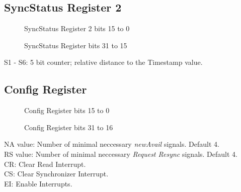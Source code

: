 \subsection{SyncStatus Register 2} 
\label{sec:SyncStatusReg2}
\begin{figure}[htb]
	\begin{center}
	\end{center}
	\caption[SyncStatus Register 2 bits 15 to 0]{SyncStatus Register 2 bits 15 to 0}
	\label{fig:SSR21}
\end{figure}
\begin{figure}[htb]
	\begin{center}
	\end{center}
	\caption[SyncStatus Register bits 31 to 16]{SyncStatus Register bits 31 to 15}
	\label{fig:SSR22}
\end{figure}
S1 - S6: 5 bit counter; relative distance to the Timestamp value. \\
\subsection{Config  Register} 
\label{sec:configReg}
\begin{figure}[htb]
	\begin{center}
	\end{center}
	\caption[Config Register bits 15 to 0]{Config Register bits 15 to 0}
	\label{fig:CR1}
\end{figure}
\begin{figure}[!htb]
	\begin{center}
	\end{center}
	\caption[Config Register bits 16 to 31]{Config Register bits 31 to 16}
	\label{fig:CR2}
\end{figure}
\noindent
NA value: Number of minimal neccessary \textit{newAvail} signals. Default 4. \\
RS value: Number of minimal neccessary \textit{Request Resync} signals. Default 4. \\ 
CR: Clear Read Interrupt. \\
CS: Clear Synchronizer Interrupt. \\ 
EI: Enable Interrupts. \\
